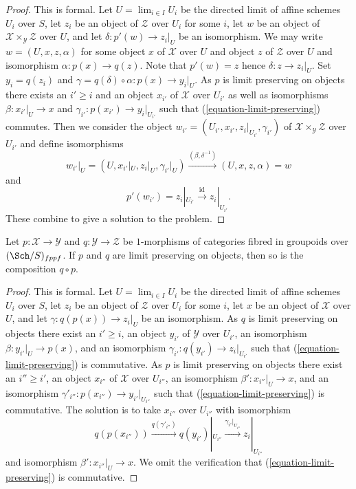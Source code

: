\begin{proof}
This is formal. Let $U = \lim_{i \in I} U_i$ be the directed limit
of affine schemes $U_i$ over $S$, let $z_i$ be an object of $\mathcal{Z}$
over $U_i$ for some $i$, let $w$ be an object of
$\mathcal{X} \times_\mathcal{Y} \mathcal{Z}$ over $U$, and let
$\delta : p'(w) \to z_i|_U$ be an isomorphism.
We may write
$w = (U, x, z, \alpha)$ for some object $x$ of $\mathcal{X}$ over $U$
and object $z$ of $\mathcal{Z}$ over $U$ and isomorphism
$\alpha : p(x) \to q(z)$. Note that $p'(w) = z$ hence
$\delta : z \to z_i|_U$. Set $y_i = q(z_i)$ and
$\gamma = q(\delta) \circ \alpha : p(x) \to y_i|_U$.
As $p$ is limit preserving on objects there exists an $i' \geq i$
and an object $x_{i'}$ of $\mathcal{X}$ over $U_{i'}$ as well as
isomorphisms $\beta : x_{i'}|_U \to x$ and
$\gamma_{i'} : p(x_{i'}) \to y_i|_{U_{i'}}$ such that
(\ref{equation-limit-preserving}) commutes. Then we consider the object
$w_{i'} = (U_{i'}, x_{i'}, z_i|_{U_{i'}}, \gamma_{i'})$ of
$\mathcal{X} \times_\mathcal{Y} \mathcal{Z}$ over $U_{i'}$
and define isomorphisms
$$
w_{i'}|_U = (U, x_{i'}|_U, z_i|_U, \gamma_{i'}|_U)
\xrightarrow{(\beta, \delta^{-1})}
(U, x, z, \alpha) = w
$$
and
$$
p'(w_{i'}) = z_i|_{U_{i'}} \xrightarrow{\text{id}} z_i|_{U_{i'}}.
$$
These combine to give a solution to the problem.
\end{proof}

\begin{lemma}
\label{lemma-composition-limit-preserving}
Let $p : \mathcal{X} \to \mathcal{Y}$ and $q : \mathcal{Y} \to \mathcal{Z}$
be $1$-morphisms of categories fibred in groupoids over $(\Sch/S)_{fppf}$.
If $p$ and $q$ are limit preserving on objects, then so is the composition
$q \circ p$.
\end{lemma}

\begin{proof}
This is formal. Let $U = \lim_{i \in I} U_i$ be the directed limit
of affine schemes $U_i$ over $S$, let $z_i$ be an object of $\mathcal{Z}$
over $U_i$ for some $i$, let $x$ be an object of $\mathcal{X}$ over $U$,
and let $\gamma : q(p(x)) \to z_i|_U$ be an isomorphism. As $q$ is
limit preserving on objects there exist an $i' \geq i$, an object
$y_{i'}$ of $\mathcal{Y}$ over $U_{i'}$, an isomorphism
$\beta : y_{i'}|_U \to p(x)$, and an isomorphism
$\gamma_{i'} : q(y_{i'}) \to z_i|_{U_{i'}}$
such that (\ref{equation-limit-preserving}) is commutative. As $p$ is
limit preserving on objects there exist an $i'' \geq i'$, an object
$x_{i''}$ of $\mathcal{X}$ over $U_{i''}$, an isomorphism
$\beta' : x_{i''}|_U \to x$, and an isomorphism
$\gamma'_{i''} : p(x_{i''}) \to y_{i'}|_{U_{i''}}$
such that (\ref{equation-limit-preserving}) is commutative.
The solution is to take $x_{i''}$ over $U_{i''}$ with isomorphism
$$
q(p(x_{i''})) \xrightarrow{q(\gamma'_{i''})}
q(y_{i'})|_{U_{i''}} \xrightarrow{\gamma_{i'}|_{U_{i''}}}
z_i|_{U_{i''}}
$$
and isomorphism $\beta' : x_{i''}|_U \to x$. We omit the verification
that (\ref{equation-limit-preserving}) is commutative.
\end{proof}

